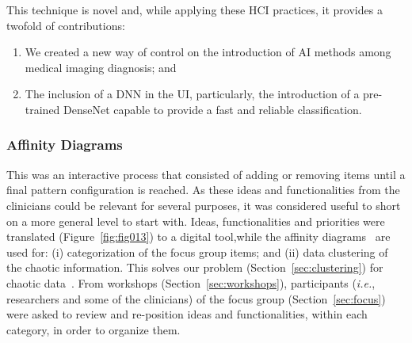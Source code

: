 \hfill

\noindent
This technique is novel and, while applying these HCI practices, it provides a twofold of contributions:

\begin{enumerate}
\item We created a new way of control on the introduction of AI methods among medical imaging diagnosis; and
\item The inclusion of a DNN in the UI, particularly, the introduction of a pre-trained DenseNet capable to provide a fast and reliable classification.
\end{enumerate}

\subsubsection{Affinity Diagrams}
\label{sec:affinity}

This was an interactive process that consisted of adding or removing items until a final pattern configuration is reached.
As these ideas and functionalities from the clinicians could be relevant for several purposes, it was considered useful to short on a more general level to start with.
Ideas, functionalities and priorities were translated (Figure~\ref{fig:fig013}) to a digital tool,\footnotemark[16] while the affinity diagrams~\cite{10.1145/3290605.3300628} are used for: (i) categorization of the focus group items; and (ii) data clustering of the chaotic information.
This solves our problem (Section~\ref{sec:clustering}) for chaotic data~\cite{10.1145/3343413.3377983, 10.1145/2858036.2858373}.
From workshops (Section~\ref{sec:workshops}), participants ({\it i.e.}, researchers and some of the clinicians) of the focus group (Section~\ref{sec:focus}) were asked to review and re-position ideas and functionalities, within each category, in order to organize them.


